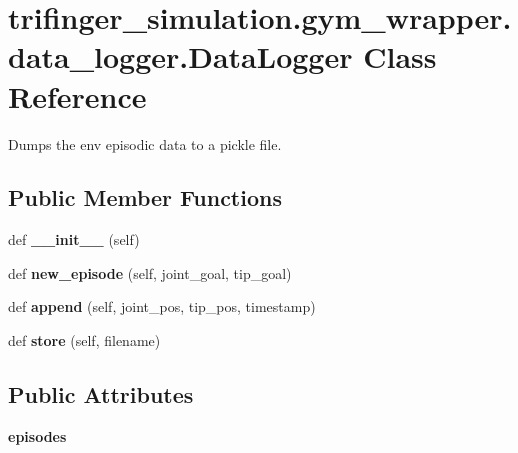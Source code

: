 \hypertarget{classtrifinger__simulation_1_1gym__wrapper_1_1data__logger_1_1DataLogger}{}\section{trifinger\+\_\+simulation.\+gym\+\_\+wrapper.\+data\+\_\+logger.\+Data\+Logger Class Reference}
\label{classtrifinger__simulation_1_1gym__wrapper_1_1data__logger_1_1DataLogger}


Dumps the env episodic data to a pickle file.  


\subsection*{Public Member Functions}
\begin{DoxyCompactItemize}
\item 
\mbox{\label{classtrifinger__simulation_1_1gym__wrapper_1_1data__logger_1_1DataLogger_a8c8b07484dfbf15cb1e3c2e89fcf51c0}} 
def {\bfseries \+\_\+\+\_\+init\+\_\+\+\_\+} (self)
\item 
\mbox{\label{classtrifinger__simulation_1_1gym__wrapper_1_1data__logger_1_1DataLogger_a818fe6118c20bd1498bd7e1f2700105b}} 
def {\bfseries new\+\_\+episode} (self, joint\+\_\+goal, tip\+\_\+goal)
\item 
\mbox{\label{classtrifinger__simulation_1_1gym__wrapper_1_1data__logger_1_1DataLogger_a2b128c4f1dc3f8ffc4b86357707dbf09}} 
def {\bfseries append} (self, joint\+\_\+pos, tip\+\_\+pos, timestamp)
\item 
\mbox{\label{classtrifinger__simulation_1_1gym__wrapper_1_1data__logger_1_1DataLogger_acc5c4317ab74121615c8c2c86973b740}} 
def {\bfseries store} (self, filename)
\end{DoxyCompactItemize}
\subsection*{Public Attributes}
\begin{DoxyCompactItemize}
\item 
\mbox{\label{classtrifinger__simulation_1_1gym__wrapper_1_1data__logger_1_1DataLogger_afaf8d0d5636dfa406e240991ad665acf}} 
{\bfseries episodes}
\end{DoxyCompactItemize}
